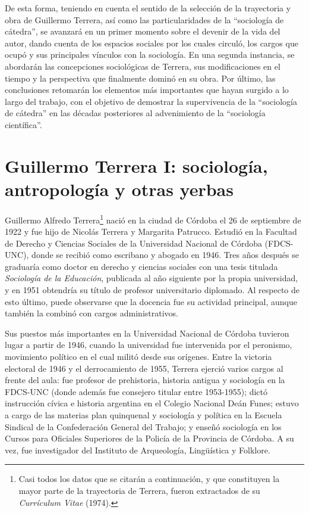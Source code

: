 De esta forma, teniendo en cuenta el sentido de la selección de la trayectoria y obra de Guillermo Terrera, así como las particularidades de la \enquote{sociología de cátedra}, se avanzará en un primer momento sobre el devenir de la vida del autor, dando cuenta de los espacios sociales por los cuales circuló, los cargos que ocupó y sus principales vínculos con la sociología. En una segunda instancia, se abordarán las concepciones sociológicas de Terrera, sus modificaciones en el tiempo y la perspectiva que finalmente dominó en su obra. Por último, las conclusiones retomarán los elementos más importantes que hayan surgido a lo largo del trabajo, con el objetivo de demostrar la supervivencia de la \enquote{sociología de cátedra} en las décadas posteriores al advenimiento de la \enquote{sociología científica}.

\section{Guillermo Terrera I: sociología, antropología y otras yerbas}

Guillermo Alfredo Terrera\footnote{Casi todos los datos que se citarán a continuación, y que constituyen la mayor parte de la trayectoria de Terrera, fueron extractados de su \emph{Currículum Vitae} (1974).} nació en la ciudad de Córdoba el 26 de septiembre de 1922 y fue hijo de Nicolás Terrera y Margarita Patrucco. Estudió en la Facultad de Derecho y Ciencias Sociales de la Universidad Nacional de Córdoba (FDCS-UNC), donde se recibió como escribano y abogado en 1946. Tres años después se graduaría como doctor en derecho y ciencias sociales con una tesis titulada \emph{Sociología de la Educación}, publicada al año siguiente por la propia universidad, y en 1951 obtendría su título de profesor universitario diplomado. Al respecto de esto último, puede observarse que la docencia fue su actividad principal, aunque también la combinó con cargos administrativos.

Sus puestos más importantes en la Universidad Nacional de Córdoba tuvieron lugar a partir de 1946, cuando la universidad fue intervenida por el peronismo, movimiento político en el cual militó desde sus orígenes. Entre la victoria electoral de 1946 y el derrocamiento de 1955, Terrera ejerció varios cargos al frente del aula: fue profesor de prehistoria, historia antigua y sociología en la FDCS-UNC (donde además fue consejero titular entre 1953-1955); dictó instrucción cívica e historia argentina en el Colegio Nacional Deán Funes; estuvo a cargo de las materias plan quinquenal y sociología y política en la Escuela Sindical de la Confederación General del Trabajo; y enseñó sociología en los Cursos para Oficiales Superiores de la Policía de la Provincia de Córdoba. A su vez, fue investigador del Instituto de Arqueología, Lingüística y Folklore.

